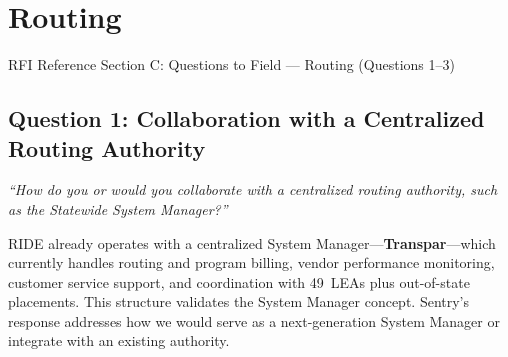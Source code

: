 \section{\texorpdfstring{\color{MidnightBlue}Routing}{Routing}}

\begin{sidebar}{RFI Reference}
Section C: Questions to Field --- Routing (Questions 1--3)
\end{sidebar}

\subsection{Question 1: Collaboration with a Centralized Routing Authority}
\textit{``How do you or would you collaborate with a centralized routing authority, such as the Statewide System Manager?''}

\vspace{0.3cm}

RIDE already operates with a centralized System Manager---\textbf{Transpar}---which currently handles routing and program billing, vendor performance monitoring, customer service support, and coordination with 49~LEAs plus out-of-state placements. This structure validates the System Manager concept. Sentry's response addresses how we would serve as a next-generation System Manager or integrate with an existing authority.

